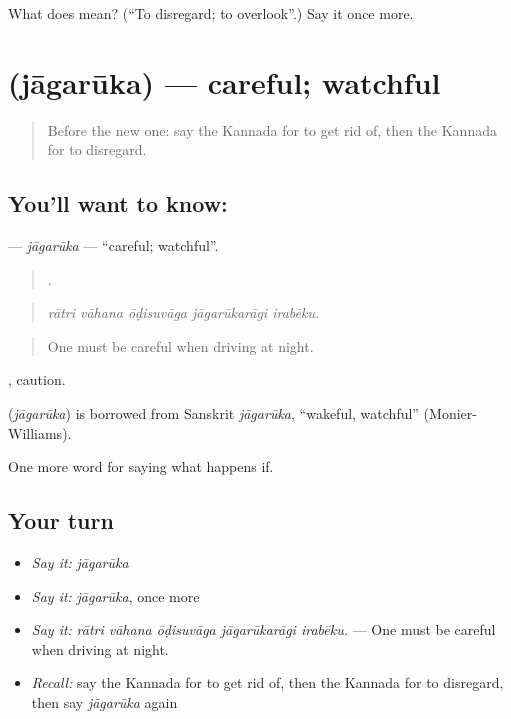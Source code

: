 \begin{tcolorbox}[breakable,colback=teal!4,colframe=teal!35!black,title={Before you move on}]
What does  mean? (\textquotedblleft{}To disregard; to overlook\textquotedblright{}.) Say it once more.
\end{tcolorbox}
\section[\texorpdfstring{\kn{ಜಾಗರೂಕ} (jāgarūka)}{ಜಾಗರೂಕ (jāgarūka)}]{ (jāgarūka) — careful; watchful}

\label{lesson:KA-C426-jagaruka}



\begin{quote}
Before the new one: say the Kannada for to get rid of, then the Kannada for to disregard.
\end{quote}

\subsection*{You'll want to know: }
\textbf{} — \emph{jāgarūka} — \textquotedblleft{}careful; watchful\textquotedblright{}.

\begin{quote}
    .
\end{quote}

\begin{quote}
\emph{rātri vāhana ōḍisuvāga jāgarūkarāgi irabēku.}
\end{quote}

\begin{quote}
One must be careful when driving at night.
\end{quote}

, caution.

\begin{cousinweb}
\textbf{} (\emph{jāgarūka}) is borrowed from Sanskrit \emph{jāgarūka}, \textquotedblleft{}wakeful, watchful\textquotedblright{} (Monier-Williams).
\end{cousinweb}

\begin{grammarlens}[title={What you've built}]
One more word for saying what happens if.
\end{grammarlens}

\subsection*{Your turn}
\begin{itemize}
\raggedright
  \item \emph{Say it:} \emph{jāgarūka}
  \item \emph{Say it:} \emph{jāgarūka}, once more
  \item \emph{Say it:} \emph{rātri vāhana ōḍisuvāga jāgarūkarāgi irabēku.} — One must be careful when driving at night.
  \item \emph{Recall:} say the Kannada for to get rid of, then the Kannada for to disregard, then say \emph{jāgarūka} again
\end{itemize}

